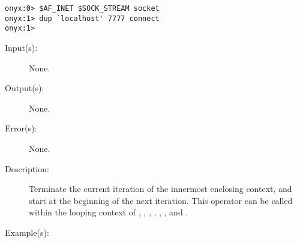 \begin{description}
\begin{description}
\begin{verbatim}
onyx:0> $AF_INET $SOCK_STREAM socket
onyx:1> dup `localhost' 7777 connect
onyx:1>
		\end{verbatim}
	\end{description}
\label{systemdict:continue}
\item[{\onyxop{--}{continue}{--}}: ]
	\begin{description}\item[]
	\item[Input(s): ] None.
	\item[Output(s): ] None.
	\item[Error(s): ] None.
	\item[Description: ]
		Terminate the current iteration of the innermost enclosing
		context, and start at the beginning of the next iteration.
		This operator can be called within the looping context of
		,
		,
		,
		,
		,
		, and
		.
	\item[Example(s): ]\begin{verbatim}


\end{verbatim}
\end{description}
\end{description}
